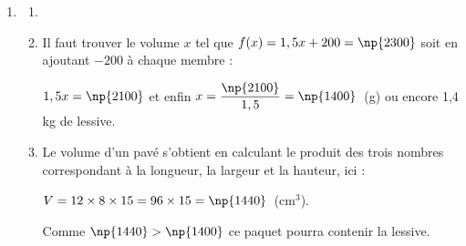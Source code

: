 \begin{enumerate}
\begin{enumerate}
	\end{enumerate}
\item
	\begin{enumerate}
		\item %
		\item %
Il faut trouver le volume $x$ tel que $f(x) = 1,5x + 200 = \np{2300}$ soit en ajoutant $- 200$ à chaque membre :

$1,5x = \np{2100}$ \quad et enfin $x = \dfrac{\np{2100}}{1,5} = \np{1400}$~(g) ou encore 1,4 kg de lessive.
		\item %

Le volume d'un pavé s'obtient en calculant le produit des trois nombres correspondant à la longueur, la largeur et la hauteur, ici :

$V = 12 \times 8 \times15 = 96 \times 15 = \np{1440}$~(cm$^3$).

Comme $\np{1440} > \np{1400}$ ce paquet pourra contenir la lessive.
	\end{enumerate}
\end{enumerate}

\medskip
